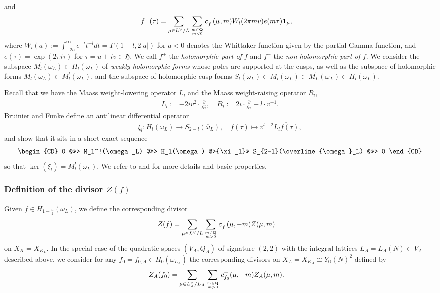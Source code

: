 \documentclass{amsart}
\theoremstyle{definition}
\theoremstyle{definition}
\theoremstyle{definition}
\begin{document}
and 
\begin{align*} f^-(\tau) &= \sum\limits_{\mu \in  L^{\vee}/L} \sum\limits_{m \in {\bf{Q}} \atop m < 0} c_f^-(\mu, m) W_l(2 \pi m v) e(m \tau) {\bf{1}}_{\mu}, \end{align*}
where $W_l(a):= \int_{-2a}^{\infty} e^{-t} t^{-l} dt = \Gamma(1-l, 2 \vert a \vert)$ for $a<0$ denotes the Whittaker function given by the partial Gamma function,
and $e(\tau) = \exp(2 \pi i \tau)$ for $\tau = u + iv \in \mathfrak{H}$. We call $f^+$ the {\it{holomorphic part of $f$}} and $f^{-}$ the {\it{non-holomorphic part of $f$}}.
We consider the subspace $M_l^!(\omega_L) \subset H_l(\omega_L)$ of {\it{weakly holomorphic forms}} whose poles are supported at the cusps,
as well as the subspace of holomorphic forms $M_l(\omega_L) \subset M_l^!(\omega_L)$, and the subspace of holomorphic cusp forms 
$S_l(\omega_L) \subset M_l(\omega_L) \subset M_L^!(\omega_L) \subset H_l(\omega_L)$.

Recall that we have the Maass weight-lowering operator $L_l$ and the Maass weight-raising operator $R_l$, 
\begin{align}\label{Maassops} L_l := - 2 i v^2 \cdot \frac{\partial }{ \partial \overline{\tau}}, \quad R_l := 2 i \cdot \frac{\partial}{ \partial \tau} + l \cdot v^{-1}. \end{align}
Bruinier and Funke \cite{BF} define an antilinear differential operator
\begin{align}\label{xi} \xi_l: H_l(\omega_L) \longrightarrow S_{2-l}(\overline{\omega}_L), \quad f(\tau) \longmapsto v^{l-2} \overline{L_l f(\tau)}, \end{align}
and show that it sits in a short exact sequence 
\begin{align*}\begin{CD} 0 @>>> M_l^!(\omega_L) @>>> H_l(\omega) @>{\xi_l}>> S_{2-l}(\overline{\omega}_L) @>>> 0 \end{CD} \end{align*}
so that $\ker(\xi_l) = M_l^!(\omega_L)$. We refer to \cite{BF} and \cite[$\S$3]{BY} for more details and basic properties.
  
\subsubsection{Definition of the divisor $Z(f)$} Given $f \in H_{1-\frac{n}{2}}(\omega_L)$, we define the corresponding divisor 
\begin{align}\label{Z(f)} Z(f) &= \sum\limits_{\mu \in L^{\vee}/L} \sum\limits_{m \in {\bf{Q}} \atop m >0} c_f^+(\mu, -m)Z(\mu, m) \end{align}
on $X_K = X_{K_L}$. In the special case of the quadratic spaces $(V_A, Q_A)$ of signature $(2,2)$ with the integral lattices 
$L_A = L_A(N) \subset V_A$ described above, we consider for any $f_0 = f_{0, A} \in H_0(\omega_{L_A})$ the corresponding divisors on $X_{A} = X_{K_A} \cong Y_0(N)^2$ defined by
\begin{align}\label{Z(f_A)} Z_A(f_0) &= \sum\limits_{\mu \in L_A^{\vee}/L_A} \sum\limits_{m \in {\bf{Q}} \atop m >0} c_{f_0}^+(\mu, -m)Z_A(\mu, m).\end{align}
\end{document}
